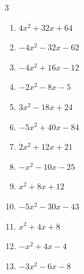 \begin{multicols}{3}
\begin{enumerate}
  \item $4x^{2}+32x+64$


  \item $-4x^{2}-32x-62$


  \item $-4x^{2}+16x-12$


  \item $-2x^{2}-8x-5$


  \item $3x^{2}-18x+24$


  \item $-5x^{2}+40x-84$


  \item $2x^{2}+12x+21$


  \item $-x^{2}-10x-25$


  \item $x^{2}+8x+12$


\columnbreak %

\resetques

  \item $-5x^{2}-30x-43$


  \item $x^{2}+4x+8$


  \item $-x^{2}+4x-4$


  \item $-3x^{2}-6x-8$



\end{enumerate}
\end{multicols}

